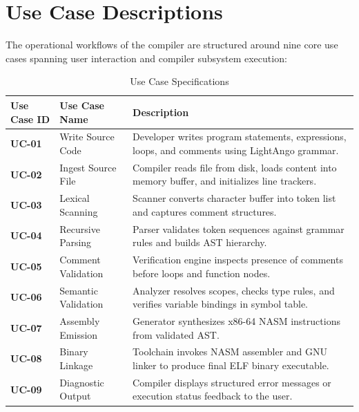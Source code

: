 \section{Use Case Descriptions}
The operational workflows of the compiler are structured around nine core use cases spanning user interaction and compiler subsystem execution:

\begin{table}[h!]
\centering
\caption{Use Case Specifications} \label{tab:use_cases}
\begin{tabular}{|p{2.0cm}|p{3.5cm}|p{8.5cm}|}
\hline
\textbf{Use Case ID} & \textbf{Use Case Name} & \textbf{Description} \\
\hline
\textbf{UC-01} & Write Source Code & Developer writes program statements, expressions, loops, and comments using LightAngo grammar. \\ \hline
\textbf{UC-02} & Ingest Source File & Compiler reads file from disk, loads content into memory buffer, and initializes line trackers. \\ \hline
\textbf{UC-03} & Lexical Scanning & Scanner converts character buffer into token list and captures comment structures. \\ \hline
\textbf{UC-04} & Recursive Parsing & Parser validates token sequences against grammar rules and builds AST hierarchy. \\ \hline
\textbf{UC-05} & Comment Validation & Verification engine inspects presence of comments before loops and function nodes. \\ \hline
\textbf{UC-06} & Semantic Validation & Analyzer resolves scopes, checks type rules, and verifies variable bindings in symbol table. \\ \hline
\textbf{UC-07} & Assembly Emission & Generator synthesizes x86-64 NASM instructions from validated AST. \\ \hline
\textbf{UC-08} & Binary Linkage & Toolchain invokes NASM assembler and GNU linker to produce final ELF binary executable. \\ \hline
\textbf{UC-09} & Diagnostic Output & Compiler displays structured error messages or execution status feedback to the user. \\ \hline
\end{tabular}
\end{table}

\newpage
